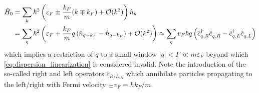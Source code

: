 \begin{align}
    \hat H_0
    &= \sum_k \hbar^2\brlr{\varepsilon_F \pm \frac{k_F}{m}(k\mp k_F) + \mathcal{O}(k^2)}\hat n_k
    \\
    &= \sum_q \hbar^2\brlr{\varepsilon_F + \frac{k_F}{m}q\brlr{\hat n_{q+k_F}-\hat n_{q-k_F}} + \mathcal{O}(k^2)}
    \approx \sum_{q} v_F \hbar q \brlr{\hat c^\dag_{q,R}\hat c^\pdag_{q,R} - \hat c^\dag_{q,L}\hat c^\pdag_{q,L}}
    \label{eq:dispersion_linearization}
\end{align}
which implies a restriction of $q$ to a small window $|q|<\Gamma\ll m\varepsilon_F$ beyond which \cref{eq:dispersion_linearization} is considered invalid.
Note the introduction of the so-called right and left operators $\hat c_{R/L,q}$ which annihilate particles propagating to the left/right with Fermi velocity $\pm v_F=\hbar k_F/m$.

